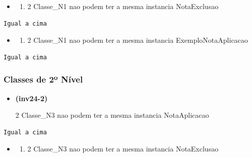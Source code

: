 \documentclass[tikz,runningheads,a4paper]{llncs}
\begin{document}
\begin{subappendices}
\begin{itemize}
\item
  \begin{enumerate}
  \def\labelenumi{(\arabic{enumi})}
  \setcounter{enumi}{22}
  \tightlist
  \item
    2 Classe\_N1 nao podem ter a mesma instancia NotaExclusao
  \end{enumerate}
\end{itemize}

\begin{lstlisting}[language=sparql, frame=single, basicstyle=\scriptsize]
Igual a cima
\end{lstlisting}

\begin{itemize}
\item
  \begin{enumerate}
  \def\labelenumi{(\arabic{enumi})}
  \setcounter{enumi}{22}
  \tightlist
  \item
    2 Classe\_N1 nao podem ter a mesma instancia ExemploNotaAplicacao
  \end{enumerate}
\end{itemize}

\begin{lstlisting}[language=sparql, frame=single, basicstyle=\scriptsize]
Igual a cima
\end{lstlisting}

\hypertarget{classes-de-2-nivel}{%
\subsubsection{Classes de 2º Nível}\label{classes-de-2uxba-nuxedvel}}

\begin{itemize}
\tightlist
\item
  \hypertarget{inv24-2}{\textbf{(inv24-2)}} 2 Classe\_N3 nao podem ter a mesma instancia
  NotaAplicacao
\end{itemize}

\begin{lstlisting}[language=sparql, frame=single, basicstyle=\scriptsize]
Igual a cima
\end{lstlisting}

\begin{itemize}
\item
  \begin{enumerate}
  \def\labelenumi{(\arabic{enumi})}
  \setcounter{enumi}{23}
  \tightlist
  \item
    2 Classe\_N3 nao podem ter a mesma instancia NotaExclusao
  \end{enumerate}
\end{itemize}


\end{subappendices}
\end{document}
